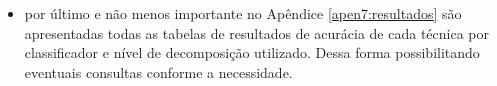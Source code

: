 \begin{itemize}
\item por último e não menos importante no Apêndice \ref{apen7:resultados} são apresentadas todas as tabelas de resultados de acurácia de cada técnica por classificador e nível de decomposição utilizado. Dessa forma possibilitando eventuais consultas conforme a necessidade.

\end{itemize}
